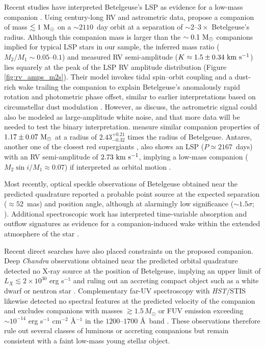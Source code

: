 \documentclass[trackchanges,twocolumn]{aastex631}
\begin{document}
Recent studies have interpreted Betelgeuse’s LSP as evidence for a low-mass companion \citep{Goldberg24,MacLeod25}. 
Using century-long RV and astrometric data, \citet{MacLeod25} propose a companion of mass $\lesssim1~{\rm M_\odot}$ on a $\sim2110$~day orbit at a separation of $\sim2$--$3\times$ Betelgeuse’s radius. 
Although this companion mass is larger than the $\sim0.1~{\rm M_\odot}$ companions implied for typical LSP stars in our sample, the inferred mass ratio ($M_2/M_1 \sim 0.05$--$0.1$) and measured RV semi-amplitude ($K \approx 1.5 \pm 0.34~{\rm km~s^{-1}}$) lies squarely at the peak of the LSP RV amplitude distribution (Figure \ref{fig:rv_amps_m2s}).
Their model invokes tidal spin--orbit coupling and a dust-rich wake trailing the companion to explain Betelgeuse’s anomalously rapid rotation and photometric phase offset, similar to earlier interpretations based on circumstellar dust modulation \citep[e.g.,][]{Goldberg24}. However, as \citet{MacLeod25} discuss, the astrometric signal could also be modeled as large-amplitude white noise, and that more data will be needed to test the binary interpretation. \citet{Goldberg24} measure similar companion properties of $1.17 \pm 0.07~{\rm M_\odot}$ at a radius of  $2.43^{+0.21}_{-0.32}$ times the radius of Betelgeuse. Antares, another one of the closest red supergiants \citep[$d=170$~pc][]{vanLeeuwen07}, also shows an LSP ($P \simeq 2167$~days) with an RV semi-amplitude of $2.73~{\rm km~s^{-1}}$, implying a low-mass companion ($M_2 \sin i/M_1 \approx 0.07$) if interpreted as orbital motion \citep{Pugh13}.

Most recently, optical speckle observations of Betelgeuse obtained near the predicted quadrature reported a probable point source at the expected separation ($\approx52$~mas) and position angle, although at alarmingly low significance ($\sim1.5\sigma$; \citealt{Howell25}). 
Additional spectroscopic work has interpreted time-variable absorption and outflow signatures as evidence for a companion-induced wake within the extended atmosphere of the star \citep{Dupree26}.

Recent direct searches have also placed constraints on the proposed companion. 
Deep {\it Chandra} observations obtained near the predicted orbital quadrature detected no X-ray source at the position of Betelgeuse, implying an upper limit of $L_X \lesssim 2\times10^{30}$ erg s$^{-1}$ and ruling out an accreting compact object such as a white dwarf or neutron star \citep{OGrady25}. 
Complementary far-UV spectroscopy with {\it HST}/STIS likewise detected no spectral features at the predicted velocity of the companion and excludes companions with masses $\gtrsim1.5\,M_\odot$ or FUV emission exceeding $\sim10^{-14}$ erg s$^{-1}$ cm$^{-2}$ \AA$^{-1}$ in the $1200$--$1700$ \AA\ band \citep{Goldberg25}. 
These observations therefore rule out several classes of luminous or accreting companions but remain consistent with a faint low-mass young stellar object.
\end{document}
